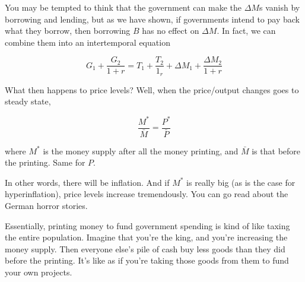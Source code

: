 \documentclass[11pt]{scrartcl}
\begin{document}
You may be tempted to think that the government can make the $\Delta M$s vanish by borrowing and lending, but as we have shown, if governments intend to pay back what they borrow, then borrowing $B$ has no effect on $\Delta M$. In fact, we can combine them into an intertemporal equation 

\[ G_1 + \frac{G_2}{1+r} = T_1 + \frac{T_2}{1_r} + \Delta M_1 + \frac{\Delta M_2}{1+r} \]

What then happens to price levels? Well, when the price/output changes goes to steady state, 

\[ \frac{M^*}{\bar{M}} = \frac{P^*}{\bar{P}} \]

where $M^*$ is the money supply after all the money printing, and $\bar{M}$ is that before the printing. Same for $P$.

In other words, there will be inflation. And if $M^*$ is really big (as is the case for hyperinflation), price levels increase tremendously. You can go read about the German horror stories.

Essentially, printing money to fund government spending is kind of like taxing the entire population. Imagine that you're the king, and you're increasing the money supply. Then everyone else's pile of cash buy less goods than they did before the printing. It's like as if you're taking those goods from them to fund your own projects. 
\end{document}
